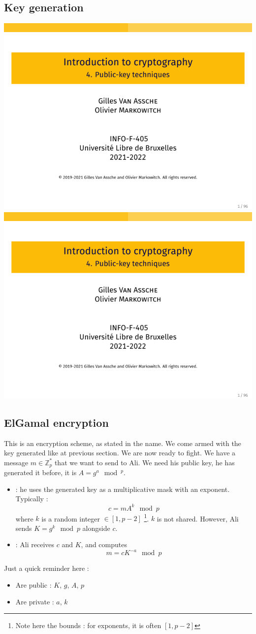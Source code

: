\documentclass[../Cryptography.tex]{subfiles}
\begin{document}
\subsection{Key generation}
\begin{center}
    \includegraphics[width=0.45\linewidth, page=63]{Slides/4-Public.pdf}
    \includegraphics[width=0.45\linewidth, page=64]{Slides/4-Public.pdf}
\end{center}

\subsection{ElGamal encryption}
This is an encryption scheme, as stated in the name. We come armed with the key generated like at previous section. We are now ready to fight. We have a message $m \in \mathbb{Z}_p ^*$ that we want to send to Ali. We need his public key, he has generated it before, it is $A = g^a\mod{^p}$. 

\begin{itemize}
    \item \textbf{} : he uses the generated key as a multiplicative mask with an exponent. Typically : $$c = m A^k \mod{p}$$ where $k$ is a random integer $\in [1, p-2]$ \footnote{Note here the bounds : for exponents, it is often $[1, p-2]$}. $k$ is not shared. However, Ali sends $K = g^k \mod{p}$ alongside $c$.
    \item \textbf{} : Ali receives $c$ and $K$, and computes $$m = c K^{-a}\mod{p}$$
\end{itemize}
Just a quick reminder here : 
\begin{itemize}
    \item Are public : $K$, $g$, $A$, $p$
    \item Are private : $a$, $k$
\end{itemize}
\end{document}
